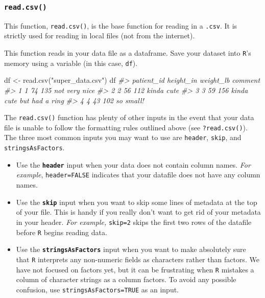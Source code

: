\documentclass[
]{book}
\newenvironment{Shaded}{\begin{snugshade}}{\end{snugshade}}
\newcommand{\CommentTok}[1]{\textcolor[rgb]{0.56,0.35,0.01}{\textit{#1}}}
\newcommand{\FunctionTok}[1]{\textcolor[rgb]{0.00,0.00,0.00}{#1}}
\newcommand{\NormalTok}[1]{#1}
\newcommand{\OtherTok}[1]{\textcolor[rgb]{0.56,0.35,0.01}{#1}}
\newcommand{\StringTok}[1]{\textcolor[rgb]{0.31,0.60,0.02}{#1}}
\begin{document}
\hypertarget{read.csv}{%
\subsubsection*{\texorpdfstring{\texttt{read.csv()}}{read.csv()}}\label{read.csv}}

This function, \texttt{read.csv()}, is the base function for reading in a \texttt{.csv}. It is strictly used for reading in local files (not from the internet).

This function reads in your data file as a dataframe. Save your dataset into \texttt{R}'s memory using a variable (in this case, \texttt{df}).

\begin{Shaded}
\begin{Highlighting}[]
\NormalTok{df }\OtherTok{\textless{}{-}} \FunctionTok{read.csv}\NormalTok{(}\StringTok{"super\_data.csv"}\NormalTok{)}
\NormalTok{df}
\CommentTok{\#\textgreater{}   patient\_id height\_in weight\_lb                   comment}
\CommentTok{\#\textgreater{} 1          1        74       135             not very nice}
\CommentTok{\#\textgreater{} 2          2        56       112                kinda cute}
\CommentTok{\#\textgreater{} 3          3        59       156 kinda cute but had a ring}
\CommentTok{\#\textgreater{} 4          4        43       102                 so small!}
\end{Highlighting}
\end{Shaded}

The \texttt{read.csv()} function has plenty of other inputs in the event that your data file is unable to follow the formatting rules outlined above (see \texttt{?read.csv()}). The three most common inputs you may want to use are \texttt{header}, \texttt{skip}, and \texttt{stringsAsFactors}.

\begin{itemize}
\item
  Use the \textbf{\texttt{header}} input when your data does not contain column names. \emph{For example}, \texttt{header=FALSE} indicates that your datafile does not have any column names.
\item
  Use the \textbf{\texttt{skip}} input when you want to skip some lines of metadata at the top of your file. This is handy if you really don't want to get rid of your metadata in your header. \emph{For example,} \texttt{skip=2} skips the first two rows of the datafile before \texttt{R} begins reading data.
\item
  Use the \textbf{\texttt{stringsAsFactors}} input when you want to make absolutely sure that \texttt{R} interprets any non-numeric fields as characters rather than factors. We have not focused on factors yet, but it can be frustrating when \texttt{R} mistakes a column of character strings as a column factors. To avoid any possible confusion, use \texttt{stringsAsFactors=TRUE} as an input.
\end{itemize}
\end{document}
